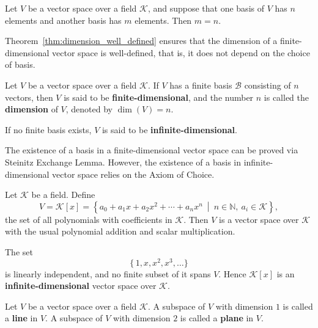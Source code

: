 \begin{theoremenv}\label{thm:dimension_well_defined}
	Let $V$ be a vector space over a field $\mathcal{K}$, and suppose that one basis of $V$ has $n$ elements and another basis has $m$ elements.
	Then $m = n$.
\end{theoremenv}

\begin{remarkenv}
    Theorem~\ref{thm:dimension_well_defined} ensures that the dimension of a finite-dimensional vector space is well-defined, that is, it does not depend on the choice of basis.
\end{remarkenv}

\begin{definitionenv}
	Let $V$ be a vector space over a field $\mathcal{K}$.
	If $V$ has a finite basis $\mathcal{B}$ consisting of $n$ vectors, then $V$ is said to be \textbf{finite-dimensional}, and the number $n$ is called the \textbf{dimension} of $V$, denoted by $\dim(V) = n$.

	If no finite basis exists, $V$ is said to be \textbf{infinite-dimensional}.
\end{definitionenv}

\begin{remarkenv}
	The existence of a basis in a finite-dimensional vector space can be proved via Steinitz Exchange Lemma. However, the existence of a basis in infinite-dimensional vector space relies on the Axiom of Choice.
\end{remarkenv}
\begin{exampleenv}
	Let $\mathcal{K}$ be a field.
	Define
	\[
	V = \mathcal{K}[x] =
	\left\{
	a_0 + a_1x + a_2x^2 + \cdots + a_nx^n
	\ \middle| \
	n \in \mathbb{N},\ a_i \in \mathcal{K}
	\right\},
	\]
	the set of all polynomials with coefficients in $\mathcal{K}$. Then $V$ is a vector space over $\mathcal{K}$ with the usual polynomial addition and scalar multiplication.

	The set
	\[
	\{\, 1, x, x^2, x^3, \dots \}
	\]
	is linearly independent, and no finite subset of it spans $V$.
	Hence $\mathcal{K}[x]$ is an \textbf{infinite-dimensional} vector space over $\mathcal{K}$.
\end{exampleenv}

\begin{definitionenv}
	Let $V$ be a vector space over a field $\mathcal{K}$.
	A subspace of $V$ with dimension $1$ is called a \textbf{line} in $V$.
	A subspace of $V$ with dimension $2$ is called a \textbf{plane} in $V$.
\end{definitionenv}


